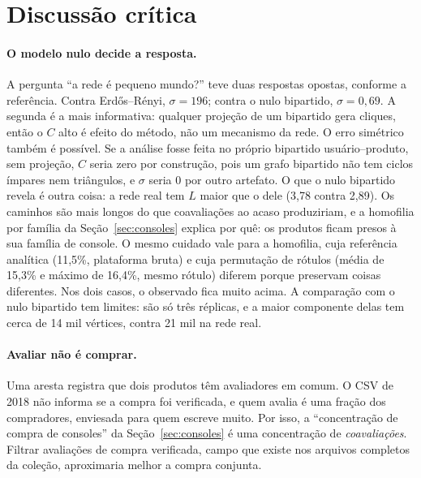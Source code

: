 \documentclass[sigconf,nonacm]{webmedia}
\begin{document}
\section{Discussão crítica}

\paragraph{O modelo nulo decide a resposta.}
A pergunta ``a rede é pequeno mundo?'' teve duas respostas opostas,
conforme a referência. Contra Erdős--Rényi, \(\sigma=196\); contra o
nulo bipartido, \(\sigma=0{,}69\). A segunda é a mais informativa:
qualquer projeção de um bipartido gera cliques, então o \(C\) alto é
efeito do método, não um mecanismo da rede. O erro simétrico também é
possível. Se a análise fosse feita no próprio bipartido
usuário--produto, sem projeção, \(C\) seria zero por construção, pois
um grafo bipartido não tem ciclos ímpares nem triângulos, e
\(\sigma\) seria 0 por outro artefato. O que o nulo bipartido revela é
outra coisa: a rede real tem \(L\) maior que o dele (3,78 contra
2,89). Os caminhos são mais longos do que coavaliações ao acaso
produziriam, e a homofilia por família da Seção~\ref{sec:consoles}
explica por quê: os produtos ficam presos à sua família de console.
O mesmo cuidado vale para a homofilia, cuja referência analítica
(11,5\%, plataforma bruta) e cuja permutação de rótulos (média de
15,3\% e máximo de 16,4\%, mesmo rótulo) diferem porque
preservam coisas diferentes. Nos dois casos, o observado fica muito
acima. A comparação com o nulo bipartido tem limites: são só três
réplicas, e a maior componente delas tem cerca de 14 mil vértices,
contra 21 mil na rede real.

\paragraph{Avaliar não é comprar.}
Uma aresta registra que dois produtos têm avaliadores em comum. O
CSV de 2018 não informa se a compra foi verificada, e quem avalia é
uma fração dos compradores, enviesada para quem escreve muito. Por
isso, a ``concentração de compra de consoles'' da Seção~\ref{sec:consoles} é uma
concentração de \emph{coavaliações}. Filtrar avaliações de compra
verificada, campo que existe nos arquivos completos da coleção,
aproximaria melhor a compra conjunta.
\end{document}
